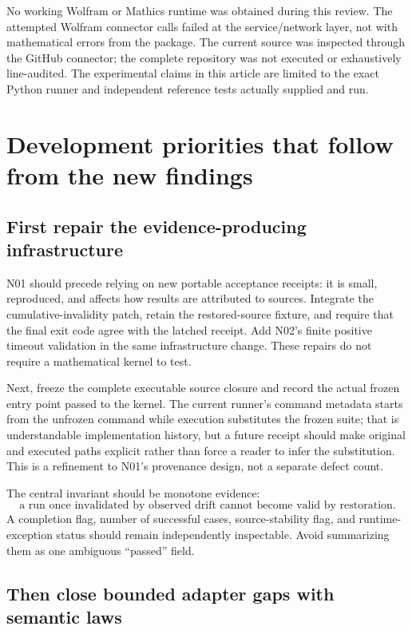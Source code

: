\documentclass[11pt,a4paper]{article}
\begin{document}
No working Wolfram or Mathics runtime was obtained during this review.
The attempted Wolfram connector calls failed at the service/network layer,
not with mathematical errors from the package. The current source was inspected
through the GitHub connector; the complete repository was not executed or
exhaustively line-audited. The experimental claims in this article are limited
to the exact Python runner and independent reference tests actually supplied
and run.

\section{Development priorities that follow from the new findings}
\label{sec:roadmap}

\subsection{First repair the evidence-producing infrastructure}

N01 should precede relying on new portable acceptance receipts: it is small,
reproduced, and affects how results are attributed to sources. Integrate the
cumulative-invalidity patch, retain the restored-source fixture, and require
that the final exit code agree with the latched receipt. Add N02's finite
positive timeout validation in the same infrastructure change. These repairs
do not require a mathematical kernel to test.

Next, freeze the complete executable source closure and record the actual
frozen entry point passed to the kernel. The current runner's command metadata
starts from the unfrozen command while execution substitutes the frozen suite;
that is understandable implementation history, but a future receipt should
make original and executed paths explicit rather than force a reader to infer
the substitution. This is a refinement to N01's provenance design, not a
separate defect count. \cite{runner}

The central invariant should be monotone evidence:
\[
  \text{a run once invalidated by observed drift cannot become valid by
  restoration.}
\]
A completion flag, number of successful cases, source-stability flag, and
runtime-exception status should remain independently inspectable. Avoid
summarizing them as one ambiguous ``passed'' field.

\subsection{Then close bounded adapter gaps with semantic laws}
\end{document}
